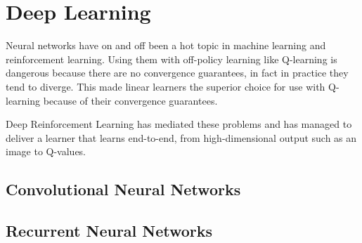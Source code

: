 \chapter{Deep Learning}
Neural networks have on and off
been a hot topic in machine learning and reinforcement learning.
Using them with off-policy learning like Q-learning
is dangerous because there are no convergence guarantees,
in fact in practice they tend to diverge.
This made linear learners the superior choice
for use with Q-learning
because of their convergence guarantees.

Deep Reinforcement Learning has mediated these problems
and has managed to deliver a learner
that learns end-to-end,
from high-dimensional output such as an image
to Q-values.


\section{Convolutional Neural Networks}

\section{Recurrent Neural Networks}